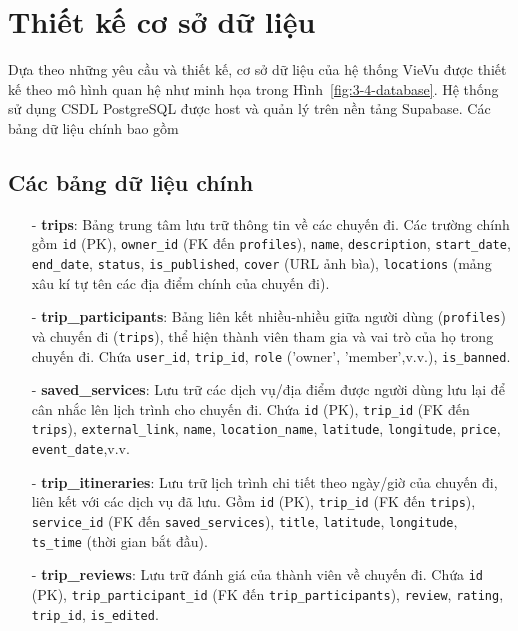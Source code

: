 \section{Thiết kế cơ sở dữ liệu}
\label{sec:3-4-database}


Dựa theo những yêu cầu và thiết kế, cơ sở dữ liệu của hệ thống VieVu được thiết kế theo mô hình quan hệ như minh họa trong Hình~\ref{fig:3-4-database}. %
Hệ thống sử dụng CSDL PostgreSQL được host và quản lý trên nền tảng Supabase. Các bảng dữ liệu chính bao gồm
\subsection{Các bảng dữ liệu chính}
\begin{itemize}
    \item[-] \textbf{trips}: Bảng trung tâm lưu trữ thông tin về các chuyến đi. Các trường chính gồm \texttt{id} (PK), \texttt{owner\_id} (FK đến \texttt{profiles}), \texttt{name}, \texttt{description}, \texttt{start\_date}, \texttt{end\_date}, \texttt{status}, \texttt{is\_published}, \texttt{cover} (URL ảnh bìa), \texttt{locations} (mảng xâu kí tự tên các địa điểm chính của chuyến đi).

    \item[-] \textbf{trip\_participants}: Bảng liên kết nhiều-nhiều giữa người dùng (\texttt{profiles}) và chuyến đi (\texttt{trips}), thể hiện thành viên tham gia và vai trò của họ trong chuyến đi. Chứa \texttt{user\_id}, \texttt{trip\_id}, \texttt{role} ('owner', 'member',v.v.), \texttt{is\_banned}.

    \item[-] \textbf{saved\_services}: Lưu trữ các dịch vụ/địa điểm được người dùng lưu lại để cân nhắc lên lịch trình cho chuyến đi. Chứa \texttt{id} (PK), \texttt{trip\_id} (FK đến \texttt{trips}), \texttt{external\_link}, \texttt{name}, \texttt{location\_name}, \texttt{latitude}, \texttt{longitude}, \texttt{price}, \texttt{event\_date},v.v.

    \item[-] \textbf{trip\_itineraries}: Lưu trữ lịch trình chi tiết theo ngày/giờ của chuyến đi, liên kết với các dịch vụ đã lưu. Gồm \texttt{id} (PK), \texttt{trip\_id} (FK đến \texttt{trips}), \texttt{service\_id} (FK đến \texttt{saved\_services}), \texttt{title}, \texttt{latitude}, \texttt{longitude}, \texttt{ts\_time} (thời gian bắt đầu).

    \item[-] \textbf{trip\_reviews}: Lưu trữ đánh giá của thành viên về chuyến đi. Chứa \texttt{id} (PK), \texttt{trip\_participant\_id} (FK đến \texttt{trip\_participants}), \texttt{review}, \texttt{rating}, \texttt{trip\_id}, \texttt{is\_edited}.
    

\end{itemize}
